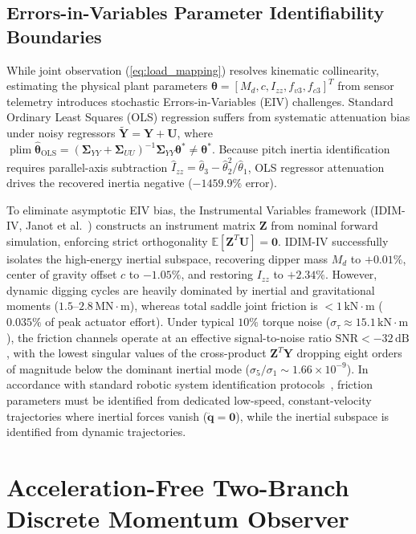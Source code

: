 \documentclass[journal]{IEEEtran}
\begin{document}
\subsection{Errors-in-Variables Parameter Identifiability Boundaries}
While joint observation (\ref{eq:load_mapping}) resolves kinematic collinearity, estimating the physical plant parameters $\bm{\theta} = [M_d, c, I_{zz}, f_{v3}, f_{c3}]^T$ from sensor telemetry introduces stochastic Errors-in-Variables (EIV) challenges. Standard Ordinary Least Squares (OLS) regression suffers from systematic attenuation bias under noisy regressors $\tilde{\bm{Y}} = \bm{Y} + \bm{U}$, where $\operatorname{plim} \hat{\bm{\theta}}_{\mathrm{OLS}} = (\bm{\Sigma}_{YY} + \bm{\Sigma}_{UU})^{-1}\bm{\Sigma}_{YY}\bm{\theta}^* \ne \bm{\theta}^*$. Because pitch inertia identification requires parallel-axis subtraction $\hat{I}_{zz} = \hat{\theta}_3 - \hat{\theta}_2^2 / \hat{\theta}_1$, OLS regressor attenuation drives the recovered inertia negative ($-1459.9\%$ error).

To eliminate asymptotic EIV bias, the Instrumental Variables framework (IDIM-IV, Janot et al.~\cite{janot2014}) constructs an instrument matrix $\bm{Z}$ from nominal forward simulation, enforcing strict orthogonality $\mathbb{E}[\bm{Z}^T \bm{U}] = \bm{0}$. IDIM-IV successfully isolates the high-energy inertial subspace, recovering dipper mass $M_d$ to $+0.01\%$, center of gravity offset $c$ to $-1.05\%$, and restoring $I_{zz}$ to $+2.34\%$. However, dynamic digging cycles are heavily dominated by inertial and gravitational moments ($1.5\text{--}2.8\,\mathrm{MN\cdot m}$), whereas total saddle joint friction is $<1\,\mathrm{kN\cdot m}$ ($0.035\%$ of peak actuator effort). Under typical $10\%$ torque noise ($\sigma_\tau \approx 15.1\,\mathrm{kN\cdot m}$), the friction channels operate at an effective signal-to-noise ratio $\mathrm{SNR} < -32\,\mathrm{dB}$, with the lowest singular values of the cross-product $\bm{Z}^T \bm{Y}$ dropping eight orders of magnitude below the dominant inertial mode ($\sigma_5 / \sigma_1 \sim 1.66\times 10^{-9}$). In accordance with standard robotic system identification protocols~\cite{swevers1997}, friction parameters must be identified from dedicated low-speed, constant-velocity trajectories where inertial forces vanish ($\ddot{\bm{q}} = \bm{0}$), while the inertial subspace is identified from dynamic trajectories.

\section{Acceleration-Free Two-Branch Discrete Momentum Observer}
\end{document}
